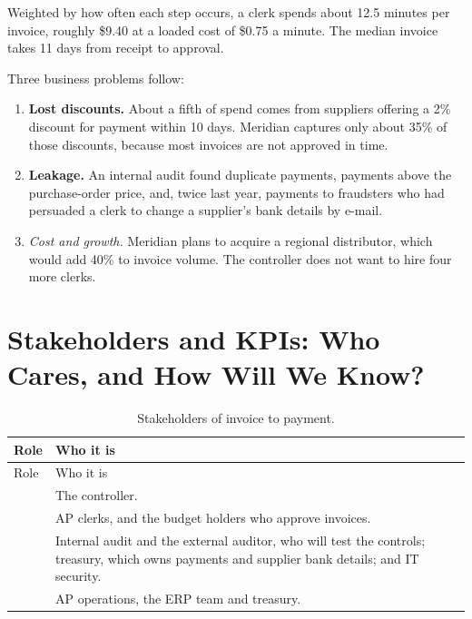 Weighted by how often each step occurs, a clerk spends about 12.5 minutes per invoice, roughly \$9.40 at a loaded cost of \$0.75 a minute. The median invoice takes 11 days from receipt to approval.

Three business problems follow:
\begin{enumerate}[itemsep=1pt]
  \item \textbf{Lost discounts.} About a fifth of spend comes from suppliers offering a 2\% discount for payment within 10 days. Meridian captures only about 35\% of those discounts, because most invoices are not approved in time.
  \item \textbf{Leakage.} An internal audit found duplicate payments, payments above the purchase-order price, and, twice last year, payments to fraudsters who had persuaded a clerk to change a supplier's bank details by e-mail.
  \item \emph{Cost and growth.} Meridian plans to acquire a regional distributor, which would add 40\% to invoice volume. The controller does not want to hire four more clerks.
\end{enumerate}

\section{Stakeholders and KPIs: Who Cares, and How Will We Know?}
\label{sec:inv-kpis}

\begingroup
\small
\begin{xltabular}{\textwidth}{@{}>{\raggedright\arraybackslash}p{2.0cm}>{\raggedright\arraybackslash}X@{}}
\caption{Stakeholders of invoice to payment.}\label{tab:inv-stakeholders}\\
\toprule
{} Role & Who it is \\
\midrule
\endfirsthead
\toprule
{} Role & Who it is \\
\midrule
\endhead
{} & The controller. \\
 & AP clerks, and the budget holders who approve invoices. \\
 & Internal audit and the external auditor, who will test the controls; treasury, which owns payments and supplier bank details; and IT security. \\
 & AP operations, the ERP team and treasury. \\
\bottomrule
\end{xltabular}
\endgroup

